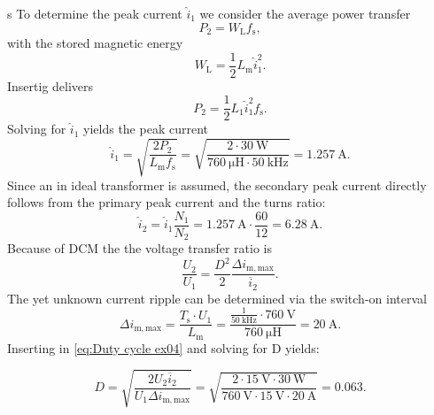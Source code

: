 \begin{solutionblock}s
To determine the peak current  $\hat i_\mathrm{1}$ we consider the average power transfer
\begin{equation}
    P_\mathrm{2} = W_\mathrm{L} f_\mathrm{s}, \label{eq:output power ex04}
\end{equation}
with the stored magnetic energy
\begin{equation}
    W_\mathrm{L} = \frac{1}{2}L_\mathrm{m}\hat i_\mathrm{1}^2. \label{eq:energy primary inductance ex04}
\end{equation}
Insertig delivers
\begin{equation}
    P_\mathrm{2} = \frac{1}{2}L_\mathrm{1}\hat i_\mathrm{1}^2 f_\mathrm{s}.\label{eq:output power with IDach ex04}
\end{equation}
Solving for $\hat i_\mathrm{1}$ yields the peak current
\begin{equation}
    \hat i_\mathrm{1} = \sqrt{\frac{2P_\mathrm{2}}{L_\mathrm{m}f_\mathrm{s}}}= \sqrt{\frac{2\cdot\SI{30}{\watt}}{\SI{760}{\micro\henry}\cdot\SI{50}{\kilo\hertz}}}=\SI{1.257}{\ampere}.
\end{equation}
Since an in ideal transformer is assumed, the secondary peak current directly follows from the primary peak current and the turns ratio:
\begin{equation}
    \hat i_\mathrm{2} = \hat i_\mathrm{1} \frac{N_\mathrm{1}}{N_\mathrm{2}} = \SI{1.257}{\ampere} \cdot \frac{60}{12} = \SI{6.28}{\ampere}.
\end{equation}
Because of DCM the the voltage transfer ratio is
\begin{equation}
    \frac{U_2}{U_1} = \frac{D^2}{2} \frac{\Delta i_\mathrm{m,max}}{\overline{i}_2}. \label{eq:Duty cycle ex04}
\end{equation}
The yet unknown current ripple can be determined via the switch-on interval
\begin{equation}
    \Delta i_\mathrm{m,max}= \frac{T_\mathrm{s} \cdot U_1}{L_\mathrm{m}} = \frac{\frac{1}{\SI{50}{\kilo\hertz}}\cdot \SI{760}{\volt}}{\SI{760}{\micro\henry}}=\SI{20}{\ampere}.
\end{equation}
Inserting in \eqref{eq:Duty cycle ex04} and solving for D yields:

\begin{equation}
    D = \sqrt{\frac{2U_2\overline{i}_2}{U_1\Delta i_\mathrm{m,max}}} = \sqrt{\frac{2\cdot \SI{15}{\volt}\cdot\SI{30}{\watt}}{\SI{760}{\volt}\cdot\SI{15}{\volt}\cdot\SI{20}{\ampere}}} = 0.063.
\end{equation}

\end{solutionblock}

